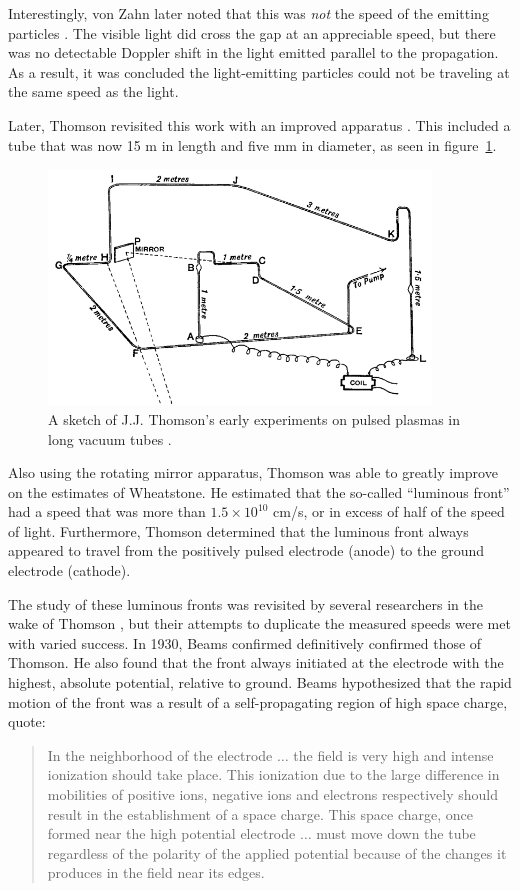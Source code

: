 Interestingly, von Zahn later noted that this was \emph{not} the speed of the
emitting particles \cite{Zahn1879}. The visible light did cross the gap at an
appreciable speed, but there was no detectable Doppler shift in the light
emitted parallel to the propagation. As a result, it was concluded the
light-emitting particles could not be traveling at the same speed as the light.

Later, Thomson revisited this work with an improved apparatus
\cite{Thomson1893}. This included a tube that was now 15 m in length and five mm
in diameter, as seen in figure~\ref{fig:thomson}.
\begin{figure}
  \centering
  \includegraphics[width=4in]{chapters/introduction/figures/thomson.png}
  \caption{A sketch of J.J. Thomson's early experiments on pulsed plasmas 
  in long vacuum tubes \cite{Thomson1893}.}\label{fig:thomson}
\end{figure}
Also using the rotating mirror apparatus, Thomson was able to greatly improve on
the estimates of Wheatstone. He estimated that the so-called ``luminous front''
had a speed that was more than $1.5\times10^{10}$ cm/s, or in excess of half of
the speed of light. Furthermore, Thomson determined that the luminous front
always appeared to travel from the positively pulsed electrode (anode) to the
ground electrode (cathode).

The study of these luminous fronts was revisited by several researchers in the
wake of Thomson \cite{James1904, Whiddington1925, Beams1926}, but their attempts
to duplicate the measured speeds were met with varied success. In 1930, Beams
confirmed definitively confirmed those of Thomson. He also found that the front
always initiated at the electrode with the highest, absolute potential, relative
to ground. Beams hypothesized that the rapid motion of the front was a result of
a self-propagating region of high space charge, quote:
\begin{quote}
  In the neighborhood of the electrode $\ldots$ the field is very high and
  intense ionization should take place. This ionization due to the large
  difference in mobilities of positive ions, negative ions and electrons
  respectively should result in the establishment of a space charge. This space
  charge, once formed near the high potential electrode $\ldots$ must move
  down the tube regardless of the polarity of the applied potential because of
  the changes it produces in the field near its edges.
\end{quote}

